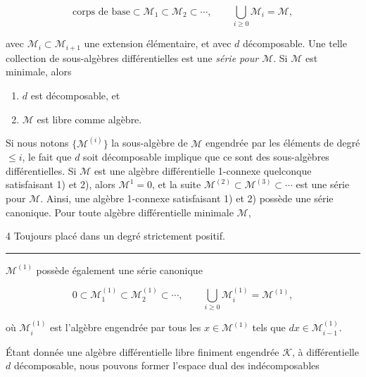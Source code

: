 \documentclass[
  french,
  a3paper,
  a3paper]{extarticle}
\begin{document}
\[
\text{corps de base}\subset\mathcal M_1\subset\mathcal M_2\subset\cdots,\qquad \bigcup_{i\ge0}\mathcal M_i=\mathcal M,
\]

avec \(\mathcal M_i\subset\mathcal M_{i+1}\) une extension élémentaire,
et avec \(d\) décomposable. Une telle collection de sous-algèbres
différentielles est une \emph{série pour \(\mathcal M\)}. Si
\(\mathcal M\) est minimale, alors

\begin{enumerate}
\def\labelenumi{\arabic{enumi})}
\item
  \(d\) est décomposable, et
\item
  \(\mathcal M\) est libre comme algèbre.
\end{enumerate}

Si nous notons \(\{\mathcal M^{(i)}\}\) la sous-algèbre de
\(\mathcal M\) engendrée par les éléments de degré \(\le i\), le fait
que \(d\) soit décomposable implique que ce sont des sous-algèbres
différentielles. Si \(\mathcal M\) est une algèbre différentielle
1-connexe quelconque satisfaisant 1) et 2), alors \(\mathcal M^1=0\), et
la suite \(\mathcal M^{(2)}\subset\mathcal M^{(3)}\subset\cdots\) est
une série pour \(\mathcal M\). Ainsi, une algèbre 1-connexe satisfaisant
1) et 2) possède une série canonique. Pour toute algèbre différentielle
minimale \(\mathcal M\),

4 Toujours placé dans un degré strictement positif.

\clearpage



\par

\vspace{0.7mm}\hrule\vspace{1.6mm}

\fontsize{9}{11}\selectfont

\(\mathcal M^{(1)}\) possède également une série canonique

\[
0\subset\mathcal M_1^{(1)}\subset\mathcal M_2^{(1)}\subset\cdots,\qquad \bigcup_{i\ge0}\mathcal M_i^{(1)}=\mathcal M^{(1)},
\]

où \(\mathcal M_i^{(1)}\) est l'algèbre engendrée par tous les
\(x\in\mathcal M^{(1)}\) tels que \(dx\in\mathcal M_{i-1}^{(1)}\).

Étant donnée une algèbre différentielle libre finiment engendrée
\(\mathcal K\), à différentielle \(d\) décomposable, nous pouvons former
l'espace dual des indécomposables
\end{document}
